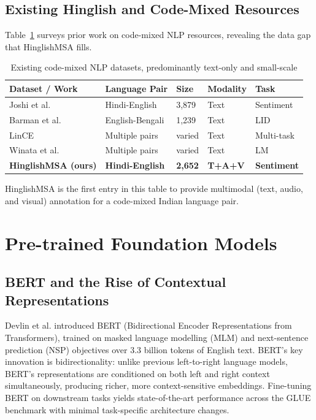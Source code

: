 \subsection{Existing Hinglish and Code-Mixed Resources}

Table~\ref{tab:codemix_datasets} surveys prior work on code-mixed NLP resources, revealing the data gap that HinglishMSA fills.

\begin{table}[ht]
\centering
\caption{Existing code-mixed NLP datasets, predominantly text-only and small-scale}
\label{tab:codemix_datasets}
\renewcommand{\arraystretch}{1.3}
\begin{tabular}{p{3.5cm} p{2.5cm} p{1.8cm} p{1.6cm} p{2.5cm}}
\toprule
\textbf{Dataset / Work} & \textbf{Language Pair} & \textbf{Size} & \textbf{Modality} & \textbf{Task} \\
\midrule
Joshi et al.\ \cite{joshi2016towards}      & Hindi-English & 3{,}879 & Text & Sentiment \\
Barman et al.\ \cite{barman2014code}       & English-Bengali & 1{,}239 & Text & LID \\
LinCE \cite{aguilar2020lince}              & Multiple pairs & varied  & Text & Multi-task \\
Winata et al.\ \cite{winata2019code}       & Multiple pairs & varied  & Text & LM \\
\midrule
\textbf{HinglishMSA (ours)} & \textbf{Hindi-English} & \textbf{2{,}652} & \textbf{T+A+V} & \textbf{Sentiment} \\
\bottomrule
\end{tabular}
\end{table}

HinglishMSA is the first entry in this table to provide multimodal (text, audio, and visual) annotation for a code-mixed Indian language pair.

\section{Pre-trained Foundation Models}

\subsection{BERT and the Rise of Contextual Representations}

Devlin et al. \cite{devlin2019bert} introduced BERT (Bidirectional Encoder Representations from Transformers), trained on masked language modelling (MLM) and next-sentence prediction (NSP) objectives over 3.3 billion tokens of English text. BERT's key innovation is bidirectionality: unlike previous left-to-right language models, BERT's representations are conditioned on both left and right context simultaneously, producing richer, more context-sensitive embeddings. Fine-tuning BERT on downstream tasks yields state-of-the-art performance across the GLUE benchmark with minimal task-specific architecture changes.

